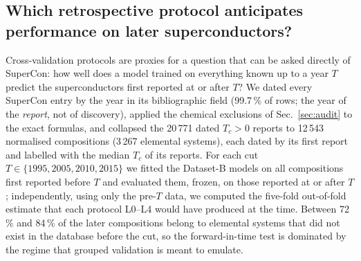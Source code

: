 
\subsection{Which retrospective protocol anticipates performance on later superconductors?}
\label{sec:temporal}

Cross-validation protocols are proxies for a question that can be asked directly of SuperCon: how well does a model trained on
everything known up to a year $T$ predict the superconductors first reported at or after $T$? We dated every SuperCon entry by the
year in its bibliographic field (99.7\,\% of rows; the year of the \emph{report}, not of discovery), applied the chemical exclusions of
Sec.~\ref{sec:audit} to the exact formulas, and collapsed the 20\,771 dated $T_c>0$ reports to 12\,543 normalised compositions
(3\,267 elemental systems), each dated by its first report and labelled with the median $T_c$ of its reports. For each cut
$T\in\{1995, 2005, 2010, 2015\}$ we fitted the Dataset-B models on all compositions first reported before $T$ and evaluated them,
frozen, on those reported at or after $T$; independently, using only the pre-$T$ data, we computed the five-fold out-of-fold estimate
that each protocol L0--L4 would have produced at the time. Between 72\,\% and 84\,\% of the later compositions belong to elemental
systems that did not exist in the database before the cut, so the forward-in-time test is dominated by the regime that grouped
validation is meant to emulate.

